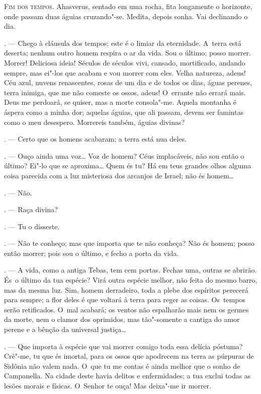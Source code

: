 \begin{linenumbers}

\textsc{Fim dos tempos.} Ahasverus, sentado em uma rocha, fita longamente o
horizonte, onde passam duas águias cruzando"-se. Medita, depois sonha.
Vai declinando o dia.

\begin{Parskip}
. --- Chego à cláusula dos tempos; este é o limiar da
eternidade. A~terra está deserta; nenhum outro homem respira o ar da
vida. Sou o último; posso morrer. Morrer! Deliciosa ideia! Séculos de
séculos vivi, cansado, mortificado, andando sempre, mas ei"-los que
acabam e vou morrer com eles. Velha natureza, adeus! Céu azul, nuvens
renascentes, rosas de um dia e de todos os dias, águas perenes, terra
inimiga, que me não comeste os ossos, adeus! O~errante não errará mais.
Deus me perdoará, se quiser, mas a morte consola"-me. Aquela montanha é
áspera como a minha dor; aquelas águias, que ali passam, devem ser
famintas como o meu desespero. Morrereis também, águias divinas?

. --- Certo que os homens acabaram; a terra está nua deles.

. --- Ouço ainda uma voz\ldots{} Voz de homem? Céus implacáveis, não
sou então o último? Ei"-lo que se aproxima\ldots{} Quem és tu? Há em teus
grandes olhos alguma coisa parecida com a luz misteriosa dos arcanjos de
Israel; não és homem\ldots{}

. --- Não.

. --- Raça divina?

. --- Tu o disseste.

. --- Não te conheço; mas que importa que te não conheça? Não és
homem; posso então morrer; pois sou o último, e fecho a porta da vida.

. --- A vida, como a antiga Tebas, tem cem portas. Fechas uma,
outras se abrirão. És~o último da tua espécie? Virá outra espécie
melhor, não feita do mesmo barro, mas da mesma luz. Sim, homem
derradeiro, toda a plebe dos espíritos perecerá para sempre; a flor
deles é que voltará à terra para reger as coisas. Os~tempos serão
retificados. O~mal acabará; os ventos não espalharão mais nem os germes
da morte, nem o clamor dos oprimidos, mas tão"-somente a cantiga do amor
perene e a bênção da universal justiça\ldots{}

. --- Que importa à espécie que vai morrer comigo toda essa
delícia póstuma? Crê"-me, tu que és imortal, para os ossos que apodrecem
na terra as púrpuras de Sidônia não valem nada. O~que tu me contas é
ainda melhor que o sonho de Campanella. Na cidade deste havia delitos e
enfermidades; a tua exclui todas as lesões morais e físicas. O~Senhor te
ouça! Mas deixa"-me ir morrer.


\end{Parskip}
\end{linenumbers}
